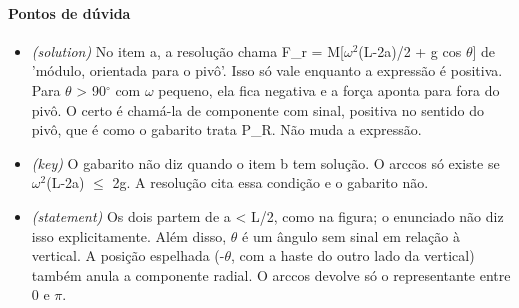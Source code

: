 \documentclass{article}%
\begin{document}
\paragraph{Pontos de dúvida}%
\begin{itemize}%
\item%
\textit{(solution)} No item a, a resolução chama F\_r = M{[}$\omega$$^2$(L-2a)/2 + g cos $\theta${]} de 'módulo, orientada para o pivô'. Isso só vale enquanto a expressão é positiva. Para $\theta$ > 90$^\circ$ com $\omega$ pequeno, ela fica negativa e a força aponta para fora do pivô. O certo é chamá{-}la de componente com sinal, positiva no sentido do pivô, que é como o gabarito trata P\_R. Não muda a expressão.%
\item%
\textit{(key)} O gabarito não diz quando o item b tem solução. O arccos só existe se $\omega$$^2$(L-2a) $\leq$ 2g. A resolução cita essa condição e o gabarito não.%
\item%
\textit{(statement)} Os dois partem de a < L/2, como na figura; o enunciado não diz isso explicitamente. Além disso, $\theta$ é um ângulo sem sinal em relação à vertical. A posição espelhada (-$\theta$, com a haste do outro lado da vertical) também anula a componente radial. O arccos devolve só o representante entre 0 e $\pi$.%
\end{itemize}%
\end{document}
